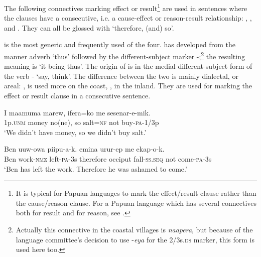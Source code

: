 The following   connectives marking effect or result\footnote{It is typical for Papuan languages to mark the effect/result clause rather than the cause/reason clause. For a Papuan language which has several connectives both for result and for reason, see \citet[267--273]{Farr1999}.} are used in sentences where the clauses have a consecutive, i.e. a cause-effect or reason-result relationship: , , and . They can all be glossed with `therefore, (and) so'.

 is the most generic and frequently used of the four.  has developed from the manner adverb  `thus' followed by the different-subject marker -;\footnote{Actually this connective in the coastal villages is \textit{naapera}, but because of the language committee's decision to use -\textit{eya} for the 2/3s.\textsc{ds} marker, this form is used here too.} the resulting meaning is `it being thus'. The origin of  is in the medial different-subject form of the verb - `say, think'. The difference between the two is mainly dialectal, or areal:   ,  is used more on the coast,   ,  in the inland. They are used for marking the effect or result clause in a consecutive sentence. 

\ea%
\label{ex:3:x731}
\gll I maamuma marew,  ifera=ko me sesenar-e-mik. \\
1p.\textsc{unm} money no(ne), so salt=\textsc{nf} not buy-\textsc{pa}-1/3p\\
\glt`We didn't have money, so we didn't buy salt.'
\z

\ea%
\label{ex:3:x732}
\gll Ben uuw-owa piipu-a-k.  emina urur-ep me ekap-o-k.\\
Ben work-\textsc{nmz} left-\textsc{pa}-3s therefore occiput fall-\textsc{ss}.\textsc{seq} not come-\textsc{pa}-3s\\
\glt`Ben has left the work. Therefore he was ashamed to come.'
\z

